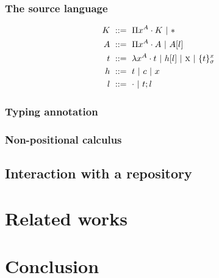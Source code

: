 \documentclass[preprint]{sigplanconf}
\newcommand\gor{\ |\ }
\newcommand\gequal{\ ::=\ }
\newcommand\meta[1]{\ensuremath\textsc{#1}}
\newcommand\postbinder{\cdot}
\newcommand\prd[2]{\ensuremath\Pi{#1}^{#2}\postbinder}
\newcommand\tlam[2]{\ensuremath\lambda{#1}^{#2}\postbinder}
\newcommand\lam{\tlam}
\newcommand\obox[3]{\ensuremath\{{#1}\}^{#2}_{#3}}
\newcommand\srt[1]{\ensuremath\mathsf{#1}}
\newcommand\type{\srt *}
\newcommand\lapp[2]{{#1}[{#2}]}
\newcommand\lnil{\cdot}
\newcommand\lcons[2]{{#1};{#2}}
\begin{document}
\subsubsection{The source language}

\begin{figure}
  \centering
  \begin{align*}
    K &\gequal { \prd x A K \gor \type } \\
    A &\gequal { \prd x A A \gor \lapp A l } \\
    t &\gequal { \lam x A t \gor \lapp h l \gor \meta x \gor \obox t x
      \sigma } \\
    h &\gequal { t \gor c \gor x } \\
    l &\gequal { \lnil \gor \lcons t l }
  \end{align*}
\end{figure}

\subsubsection{Typing annotation}

\subsubsection{Non-positional calculus}

\subsection{Interaction with a repository}



\section{Related works} %




\section{Conclusion} %


\end{document}
